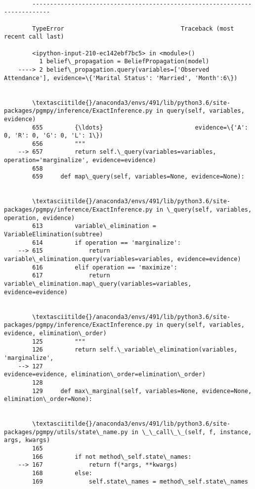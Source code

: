 \documentclass[11pt]{article}
\begin{document}
    \begin{Verbatim}[commandchars=\\\{\}]

        ---------------------------------------------------------------------------

        TypeError                                 Traceback (most recent call last)

        <ipython-input-210-ec142ebf7bc5> in <module>()
          1 belief\_propagation = BeliefPropagation(model)
    ----> 2 belief\_propagation.query(variables=['Observed Attendance'], evidence=\{'Marital Status': 'Married', 'Month':6\})
    

        \textasciitilde{}/anaconda3/envs/491/lib/python3.6/site-packages/pgmpy/inference/ExactInference.py in query(self, variables, evidence)
        655         {\ldots}                          evidence=\{'A': 0, 'R': 0, 'G': 0, 'L': 1\})
        656         """
    --> 657         return self.\_query(variables=variables, operation='marginalize', evidence=evidence)
        658 
        659     def map\_query(self, variables=None, evidence=None):


        \textasciitilde{}/anaconda3/envs/491/lib/python3.6/site-packages/pgmpy/inference/ExactInference.py in \_query(self, variables, operation, evidence)
        613         variable\_elimination = VariableElimination(subtree)
        614         if operation == 'marginalize':
    --> 615             return variable\_elimination.query(variables=variables, evidence=evidence)
        616         elif operation == 'maximize':
        617             return variable\_elimination.map\_query(variables=variables, evidence=evidence)


        \textasciitilde{}/anaconda3/envs/491/lib/python3.6/site-packages/pgmpy/inference/ExactInference.py in query(self, variables, evidence, elimination\_order)
        125         """
        126         return self.\_variable\_elimination(variables, 'marginalize',
    --> 127                                           evidence=evidence, elimination\_order=elimination\_order)
        128 
        129     def max\_marginal(self, variables=None, evidence=None, elimination\_order=None):


        \textasciitilde{}/anaconda3/envs/491/lib/python3.6/site-packages/pgmpy/utils/state\_name.py in \_\_call\_\_(self, f, instance, args, kwargs)
        165 
        166         if not method\_self.state\_names:
    --> 167             return f(*args, **kwargs)
        168         else:
        169             self.state\_names = method\_self.state\_names



\end{Verbatim}
\end{document}
